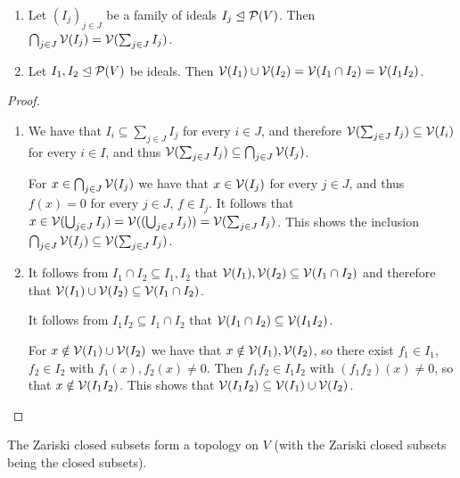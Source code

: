 \begin{lemma}
  \label{lemma: intersections and unions of Zariski closed sets}
  \leavevmode
  \begin{enumerate}
    \item
      Let $(I_j)_{j \in J}$ be a family of ideals $I_j \trianglelefteq \mathcal{P}(V)$.
      Then $\bigcap_{j \in J} \mathcal{V}(I_j) = \mathcal{V}( \sum_{j \in J} I_j )$.
    \item
      Let $I_1, I_2 \trianglelefteq \mathcal{P}(V)$ be ideals.
      Then $\mathcal{V}(I_1) \cup \mathcal{V}(I_2) = \mathcal{V}(I_1 \cap I_2) = \mathcal{V}(I_1 I_2)$.
  \end{enumerate}
\end{lemma}
\begin{proof}
  \leavevmode
  \begin{enumerate}
    \item
      We have that $I_i \subseteq \sum_{j \in J} I_j$ for every $i \in J$, and therefore $\mathcal{V}( \sum_{j \in J} I_j ) \subseteq \mathcal{V}(I_i)$ for every $i \in I$, and thus $\mathcal{V}( \sum_{j \in J} I_j ) \subseteq \bigcap_{j \in J} \mathcal{V}(I_j)$.
      
      For $x \in \bigcap_{j \in J} \mathcal{V}(I_j)$ we have that $x \in \mathcal{V}(I_j)$ for every $j \in J$, and thus $f(x) = 0$ for every $j \in J$, $f \in I_j$.
      It follows that $x \in \mathcal{V}( \bigcup_{j \in J} I_j ) = \mathcal{V}( (\bigcup_{j \in J} I_j) ) = \mathcal{V}( \sum_{j \in J} I_j )$.
      This shows the inclusion $\bigcap_{j \in J} \mathcal{V}(I_j) \subseteq \mathcal{V}( \sum_{j \in J} I_j )$.
    \item
      It follows from $I_1 \cap I_2 \subseteq I_1, I_2$ that $\mathcal{V}(I_1), \mathcal{V}(I_2) \subseteq \mathcal{V}(I_1 \cap I_2)$ and therefore that $\mathcal{V}(I_1) \cup \mathcal{V}(I_2) \subseteq \mathcal{V}(I_1 \cap I_2)$.
      
      It follows from $I_1 I_2 \subseteq I_1 \cap I_2$ that $\mathcal{V}(I_1 \cap I_2) \subseteq \mathcal{V}(I_1 I_2)$.
      
      For $x \notin \mathcal{V}(I_1) \cup \mathcal{V}(I_2)$ we have that $x \notin \mathcal{V}(I_1), \mathcal{V}(I_2)$, so there exist $f_1 \in I_1$, $f_2 \in I_2$ with $f_1(x), f_2(x) \neq 0$.
      Then $f_1 f_2 \in I_1 I_2$ with $(f_1 f_2)(x) \neq 0$, so that $x \notin \mathcal{V}(I_1 I_2)$.
      This shows that $\mathcal{V}(I_1 I_2) \subseteq \mathcal{V}(I_1) \cup \mathcal{V}(I_2)$.
    \qedhere
  \end{enumerate}
\end{proof}


\begin{corollary}
  The Zariski closed subsets form a topology on $V$ (with the Zariski closed subsets being the closed subsets).
\end{corollary}


